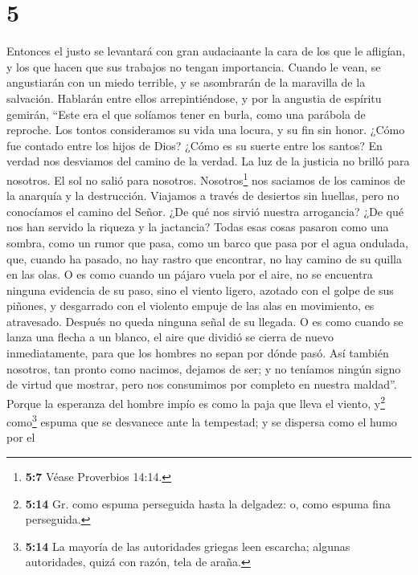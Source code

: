 \hypertarget{section-4}{%
\section{5}\label{section-4}}

 Entonces el justo se levantará con gran audaciaante la
cara de los que le afligían, y los que hacen que sus trabajos no tengan
importancia.  Cuando le vean, se angustiarán con un miedo
terrible, y se asombrarán de la maravilla de la salvación.
 Hablarán entre ellos arrepintiéndose, y por la angustia
de espíritu gemirán, ``Este era el que solíamos tener en burla, como una
parábola de reproche.  Los tontos consideramos su vida una
locura, y su fin sin honor.  ¿Cómo fue contado entre los
hijos de Dios? ¿Cómo es su suerte entre los santos?  En
verdad nos desviamos del camino de la verdad. La luz de la justicia no
brilló para nosotros. El sol no salió para nosotros. 
Nosotros\footnote{\textbf{5:7} Véase Proverbios 14:14.} nos saciamos de
los caminos de la anarquía y la destrucción. Viajamos a través de
desiertos sin huellas, pero no conocíamos el camino del Señor.
 ¿De qué nos sirvió nuestra arrogancia? ¿De qué nos han
servido la riqueza y la jactancia?  Todas esas cosas
pasaron como una sombra, como un rumor que pasa,  como un
barco que pasa por el agua ondulada, que, cuando ha pasado, no hay
rastro que encontrar, no hay camino de su quilla en las olas.
 O es como cuando un pájaro vuela por el aire, no se
encuentra ninguna evidencia de su paso, sino el viento ligero, azotado
con el golpe de sus piñones, y desgarrado con el violento empuje de las
alas en movimiento, es atravesado. Después no queda ninguna señal de su
llegada.  O es como cuando se lanza una flecha a un
blanco, el aire que dividió se cierra de nuevo inmediatamente, para que
los hombres no sepan por dónde pasó.  Así también
nosotros, tan pronto como nacimos, dejamos de ser; y no teníamos ningún
signo de virtud que mostrar, pero nos consumimos por completo en nuestra
maldad''.  Porque la esperanza del hombre impío es como
la paja que lleva el viento, y\footnote{\textbf{5:14} Gr. como espuma
  perseguida hasta la delgadez: o, como espuma fina perseguida.}
como\footnote{\textbf{5:14} La mayoría de las autoridades griegas leen
  escarcha; algunas autoridades, quizá con razón, tela de araña.} espuma
que se desvanece ante la tempestad; y se dispersa como el humo por el
